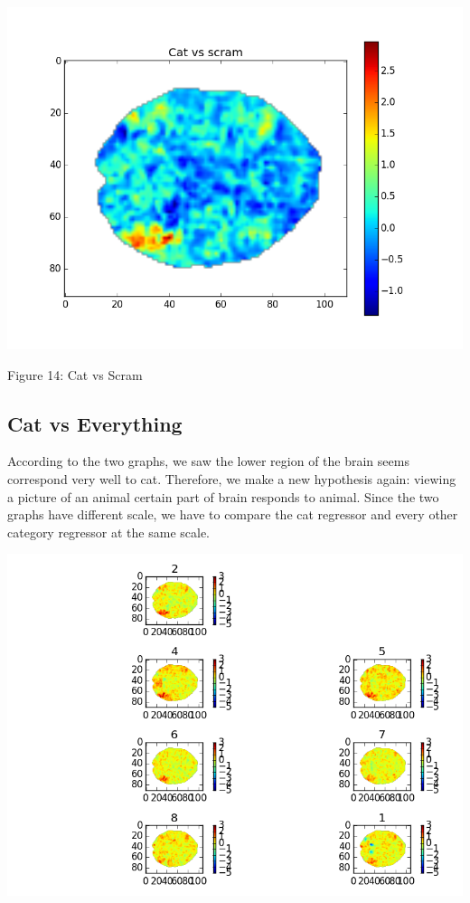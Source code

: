\documentclass[12pt]{article}
\begin{document}
\begin{housevseverything}
\begin{housevseverything}
\begin{housevseverything}
    \centering
      \includegraphics{cat_vs_scram}
    \caption{Figure 14: Cat vs Scram}


\end{housevseverything}



\subsection{Cat vs Everything}

According to the two graphs, we saw the lower region of the brain seems correspond very well to cat. Therefore, we make a new hypothesis again:  viewing a picture of an animal certain part of brain responds to animal. Since the two graphs have different scale, we have to compare the cat regressor and every other category regressor at the same scale.

\begin{housevseverything}
    \centering
      \includegraphics[width=.8\textwidth]{cat_everything}
\end{housevseverything}
       

\end{housevseverything}
\end{housevseverything}
\end{document}
